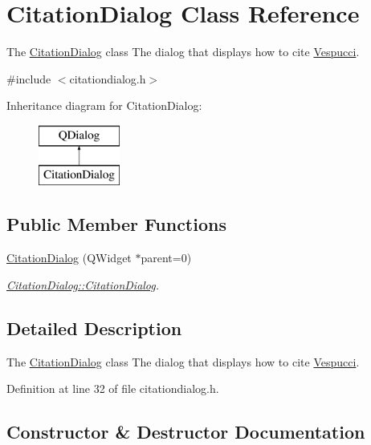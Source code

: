 \hypertarget{class_citation_dialog}{}\section{Citation\+Dialog Class Reference}
\label{class_citation_dialog}


The \hyperlink{class_citation_dialog}{Citation\+Dialog} class The dialog that displays how to cite \hyperlink{namespace_vespucci}{Vespucci}.  




{\ttfamily \#include $<$citationdialog.\+h$>$}

Inheritance diagram for Citation\+Dialog\+:\begin{figure}[H]
\begin{center}
\leavevmode
\includegraphics[height=2.000000cm]{class_citation_dialog}
\end{center}
\end{figure}
\subsection*{Public Member Functions}
\begin{DoxyCompactItemize}
\item 
\hyperlink{class_citation_dialog_a566d6d063e20f68d619ff15412bda2f0}{Citation\+Dialog} (Q\+Widget $\ast$parent=0)
\begin{DoxyCompactList}\small\item\em \hyperlink{class_citation_dialog_a566d6d063e20f68d619ff15412bda2f0}{Citation\+Dialog\+::\+Citation\+Dialog}. \end{DoxyCompactList}\end{DoxyCompactItemize}


\subsection{Detailed Description}
The \hyperlink{class_citation_dialog}{Citation\+Dialog} class The dialog that displays how to cite \hyperlink{namespace_vespucci}{Vespucci}. 

Definition at line 32 of file citationdialog.\+h.



\subsection{Constructor \& Destructor Documentation}
